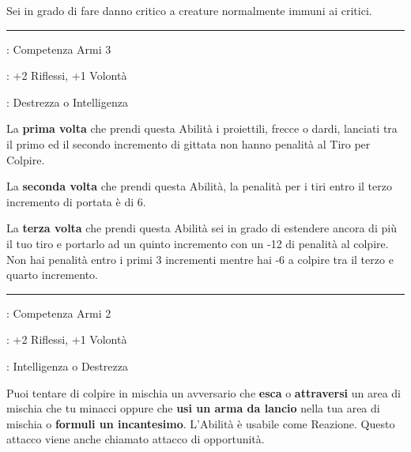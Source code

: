 \begin{multicols}{2}
Sei in grado di fare danno critico a creature normalmente immuni ai critici.

\smallskip\noindent\rule{\linewidth}{2pt} \hypertarget{Occhio di Falco}{}\medskip{}
\noindent
\begin{description}[noitemsep, topsep=0pt, parsep=0pt, partopsep=0pt, leftmargin=0cm, labelwidth=2.5cm]
    \item[\textbf{Requisito}]: Competenza Armi 3
    \item[\textbf{Tiri Salvezza}]: +2 Riflessi, +1 Volontà
    \item[\textbf{Caratteristica}]: Destrezza o Intelligenza
\end{description}

La \textbf{prima volta} che prendi questa Abilità i proiettili, frecce o dardi, lanciati tra il primo ed il secondo incremento di gittata non hanno penalità al Tiro per Colpire.

La \textbf{seconda volta} che prendi questa Abilità, la penalità per i tiri entro il terzo incremento di portata è di 6.

La \textbf{terza volta} che prendi questa Abilità sei in grado di estendere ancora di più il tuo tiro e portarlo ad un quinto incremento con un -12 di penalità al colpire. Non hai penalità entro i primi 3 incrementi mentre hai -6 a colpire tra il terzo e quarto incremento.

\smallskip\noindent\rule{\linewidth}{2pt} \hypertarget{Opportunista}{}\medskip{}
\noindent
\begin{description}[noitemsep, topsep=0pt, parsep=0pt, partopsep=0pt, leftmargin=0cm, labelwidth=2.5cm]
    \item[\textbf{Requisito}]: Competenza Armi 2
    \item[\textbf{Tiri Salvezza}]: +2 Riflessi, +1 Volontà
    \item[\textbf{Caratteristica}]: Intelligenza o Destrezza
\end{description}

\label{attaccoopportunita}

Puoi tentare di colpire in mischia un avversario che \textbf{esca} o \textbf{attraversi} un area di mischia che tu minacci oppure che \textbf{usi un arma da lancio} nella tua area di mischia o \textbf{formuli un incantesimo}. L'Abilità è usabile come Reazione. Questo attacco viene anche chiamato attacco di opportunità.


\end{multicols}
